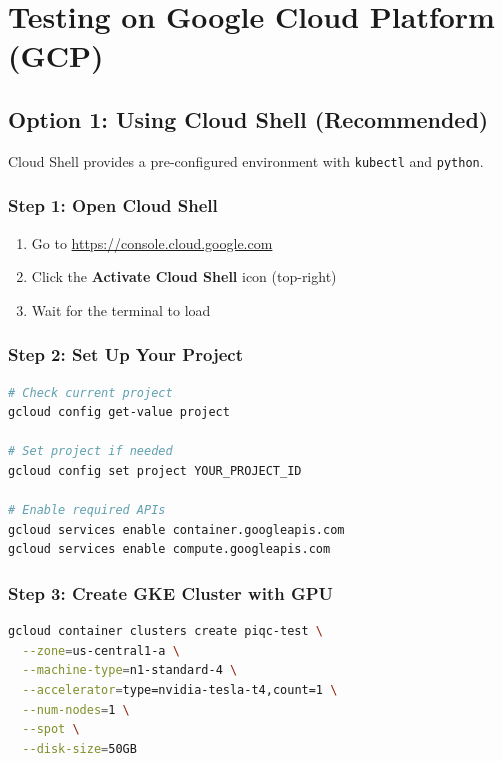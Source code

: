 \documentclass[11pt,a4paper]{article}
\begin{document}
\section{Testing on Google Cloud Platform (GCP)}

\subsection{Option 1: Using Cloud Shell (Recommended)}

Cloud Shell provides a pre-configured environment with \texttt{kubectl} and \texttt{python}.

\subsubsection{Step 1: Open Cloud Shell}

\begin{enumerate}
    \item Go to \url{https://console.cloud.google.com}
    \item Click the \textbf{Activate Cloud Shell} icon (top-right)
    \item Wait for the terminal to load
\end{enumerate}

\subsubsection{Step 2: Set Up Your Project}

\begin{lstlisting}[language=bash]
# Check current project
gcloud config get-value project

# Set project if needed
gcloud config set project YOUR_PROJECT_ID

# Enable required APIs
gcloud services enable container.googleapis.com
gcloud services enable compute.googleapis.com
\end{lstlisting}

\subsubsection{Step 3: Create GKE Cluster with GPU}

\begin{lstlisting}[language=bash,basicstyle=\ttfamily\footnotesize]
gcloud container clusters create piqc-test \
  --zone=us-central1-a \
  --machine-type=n1-standard-4 \
  --accelerator=type=nvidia-tesla-t4,count=1 \
  --num-nodes=1 \
  --spot \
  --disk-size=50GB
\end{lstlisting}
\end{document}

